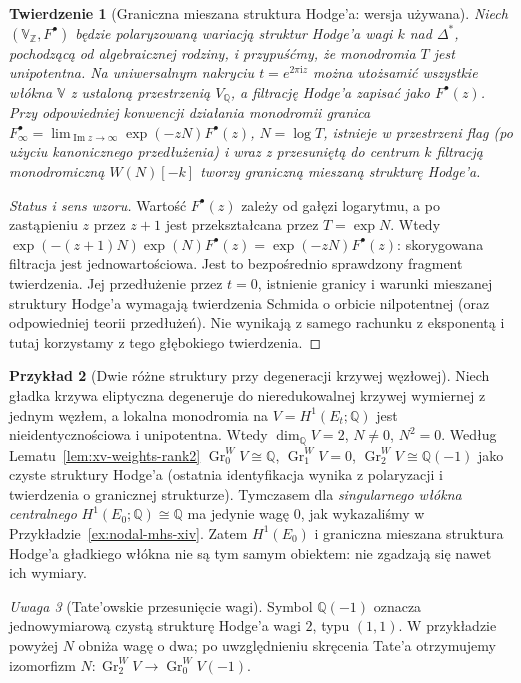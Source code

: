 \documentclass[11pt,a4paper,oneside]{report}
\newcommand{\Z}{\mathbb{Z}}
\newcommand{\Q}{\mathbb{Q}}
\theoremstyle{plain}
\newtheorem{twierdzenie}{Twierdzenie}[section]
\theoremstyle{definition}
\newtheorem{przyklad}[twierdzenie]{Przykład}
\theoremstyle{remark}
\newtheorem{uwaga}[twierdzenie]{Uwaga}
\begin{document}
\begin{twierdzenie}[Graniczna mieszana struktura Hodge'a: wersja używana]
\label{thm:xv-lmhs}
Niech $(\mathbb V_\Z,F^\bullet)$ będzie polaryzowaną
wariacją struktur Hodge'a wagi $k$ nad $\Delta^*$,
pochodzącą od algebraicznej rodziny, i przypuśćmy,
że monodromia $T$ jest unipotentna.
Na uniwersalnym nakryciu $t=e^{2\pi\mathrm iz}$
można utożsamić wszystkie włókna $\mathbb V$ z ustaloną
przestrzenią $V_\Q$, a filtrację Hodge'a zapisać jako
$F^\bullet(z)$. Przy odpowiedniej konwencji działania
monodromii granica
$F^\bullet_\infty=\lim_{\operatorname{Im}z\to\infty}
\exp(-zN)F^\bullet(z)$, $N=\log T$,
istnieje w przestrzeni flag (po użyciu kanonicznego
przedłużenia) i wraz z przesuniętą do centrum $k$
filtracją monodromiczną $W(N)[-k]$ tworzy graniczną
mieszaną strukturę Hodge'a.
\end{twierdzenie}
\begin{proof}[Status i sens wzoru]
Wartość $F^\bullet(z)$ zależy od gałęzi logarytmu,
a po zastąpieniu $z$ przez $z+1$ jest przekształcana
przez $T=\exp N$. Wtedy
$\exp(-(z+1)N)\exp(N)F^\bullet(z)
=\exp(-zN)F^\bullet(z)$: skorygowana filtracja
jest jednowartościowa. Jest to bezpośrednio sprawdzony
fragment twierdzenia. Jej przedłużenie przez $t=0$,
istnienie granicy i warunki mieszanej struktury Hodge'a
wymagają twierdzenia Schmida o orbicie nilpotentnej
(oraz odpowiedniej teorii przedłużeń). Nie wynikają
z samego rachunku z eksponentą i tutaj korzystamy
z tego głębokiego twierdzenia.
\end{proof}

\begin{przyklad}[Dwie różne struktury przy degeneracji krzywej węzłowej]
\label{ex:xv-central-limit}
Niech gładka krzywa eliptyczna degeneruje do
nieredukowalnej krzywej wymiernej z jednym węzłem,
a lokalna monodromia na $V=H^1(E_t;\Q)$ jest
nieidentycznościowa i unipotentna.
Wtedy $\dim_\Q V=2$, $N\ne0$, $N^2=0$.
Według Lematu~\ref{lem:xv-weights-rank2}
$\operatorname{Gr}_0^WV\cong\Q$,
$\operatorname{Gr}_1^WV=0$,
$\operatorname{Gr}_2^WV\cong\Q(-1)$ jako czyste
struktury Hodge'a (ostatnia identyfikacja wynika z
polaryzacji i twierdzenia o granicznej strukturze).
Tymczasem dla \emph{singularnego włókna centralnego}
$H^1(E_0;\Q)\cong\Q$ ma jedynie wagę $0$,
jak wykazaliśmy w Przykładzie~\ref{ex:nodal-mhs-xiv}.
Zatem $H^1(E_0)$ i graniczna mieszana struktura
Hodge'a gładkiego włókna nie są tym samym obiektem:
nie zgadzają się nawet ich wymiary.
\end{przyklad}
\begin{uwaga}[Tate'owskie przesunięcie wagi]
Symbol $\Q(-1)$ oznacza jednowymiarową czystą
strukturę Hodge'a wagi $2$, typu $(1,1)$.
W przykładzie powyżej $N$ obniża wagę o dwa;
po uwzględnieniu skręcenia Tate'a otrzymujemy
izomorfizm $N:\operatorname{Gr}_2^WV\to
\operatorname{Gr}_0^WV(-1)$.
\end{uwaga}
\end{document}

